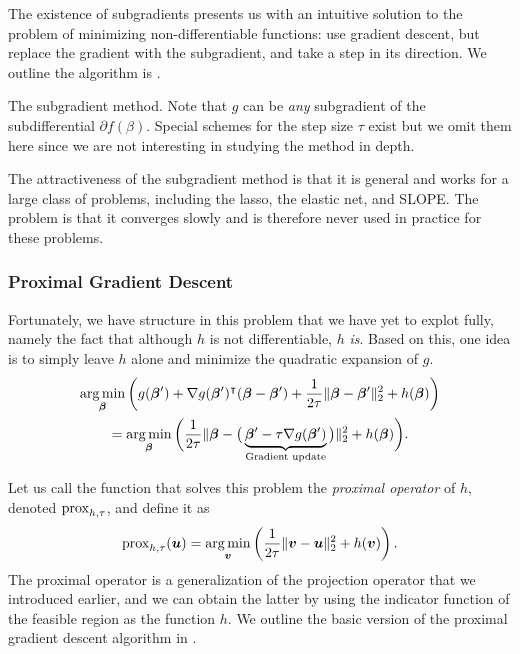 The existence of subgradients presents us with an intuitive solution to the problem of minimizing non-differentiable functions: use gradient descent, but replace the gradient with the subgradient, and take a step in its direction. We outline the algorithm is .

\begin{algorithm}
  \caption{The subgradient method. Note that \(g\) can be \emph{any} subgradient of the subdifferential \(\partial f(\beta)\). Special schemes for the step size \(\tau\) exist but we omit them here since we are not interesting in studying the method in depth.}
  \label{alg:subgradient-method}
\end{algorithm}

The attractiveness of the subgradient method is that it is general and works for a large class of problems, including the lasso, the elastic net, and SLOPE. The problem is that it converges slowly and is therefore never used in practice for these problems.

\subsubsection{Proximal Gradient Descent}

Fortunately, we have structure in this problem that we have yet to explot fully, namely the fact that although \(h\) is not differentiable, \(h\) \emph{is}. Based on this, one idea is to simply leave \(h\) alone and minimize the quadratic expansion of \(g\).
\begin{multline*}
  \operatorname*{arg\,min}_{\boldsymbol{\beta}} \left( g(\boldsymbol{\beta}') + \nabla g(\boldsymbol{\beta}')^\intercal(\boldsymbol{\beta} - \boldsymbol{\beta}') + \frac{1}{2\tau}\lVert \boldsymbol{\beta} - \boldsymbol{\beta}'\rVert_2^2 + h(\boldsymbol{\beta}) \right) \\
  = \operatorname*{arg\,min}_{\boldsymbol{\beta}} \bigg( \frac{1}{2\tau}\lVert \boldsymbol{\beta} - \big(\underbrace{\boldsymbol{\beta}' - \tau \nabla g(\boldsymbol{\beta}')}_{\text{Gradient update}}\big)\rVert_2^2 + h(\boldsymbol{\beta})\bigg).
\end{multline*}

Let us call the function that solves this problem the \emph{proximal operator} of \(h\), denoted \(\operatorname{prox}_{h,\tau}\), and define it as
\[
  \operatorname{prox}_{h,\tau}(\boldsymbol{u}) = \operatorname*{arg\,min}_{\boldsymbol{v}} \left( \frac{1}{2\tau}\lVert \boldsymbol{v} - \boldsymbol{u}\rVert_2^2 + h(\boldsymbol{v}) \right).
\]
The proximal operator is a generalization of the projection operator that we introduced earlier, and we can obtain the latter by using the indicator function of the feasible region as the function \(h\). We outline the basic version of the proximal gradient descent algorithm in .

